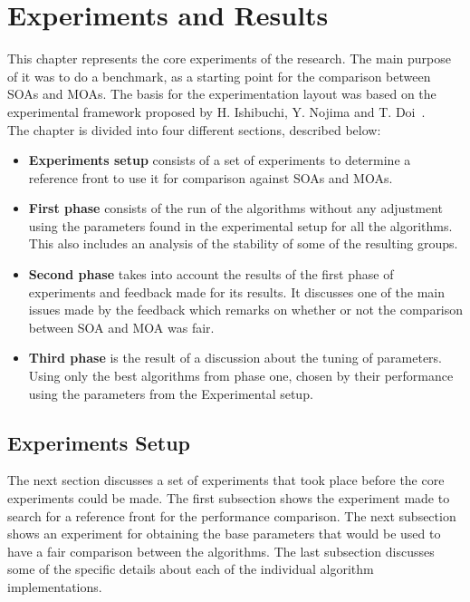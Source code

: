 \chapter{Experiments and Results}
\label{chapter:chapter05}

This chapter represents the core experiments of the research. The main purpose of it was to do a benchmark, as a starting point for the comparison between SOAs and MOAs. The basis for the experimentation layout was based on the experimental framework proposed by H. Ishibuchi, Y. Nojima and T. Doi~\cite{Ishibuchi_single_vs_multiobjective}. \\

The chapter is divided into four different sections, described below:

\begin{itemize}
    \item \textbf{Experiments setup} consists of a set of experiments to determine a reference front to use it for comparison against SOAs and MOAs.
    \item \textbf{First phase} consists of the run of the algorithms without any adjustment using the parameters found in the experimental setup for all the algorithms. This also includes an analysis of the stability of some of the resulting groups.
    \item \textbf{Second phase} takes into account the results of the first phase of experiments and feedback made for its results. It discusses one of the main issues made by the feedback which remarks on whether or not the comparison between SOA and MOA was fair.
    \item \textbf{Third phase} is the result of a discussion about the tuning of parameters. Using only the best algorithms from phase one, chosen by their performance using the parameters from the Experimental setup. 
\end{itemize}

\section{Experiments Setup}

The next section discusses a set of experiments that took place before the core experiments could be made. The first subsection shows the experiment made to search for a reference front for the performance comparison. The next subsection shows an experiment for obtaining the base parameters that would be used to have a fair comparison between the algorithms. The last subsection discusses some of the specific details about each of the individual algorithm implementations.

